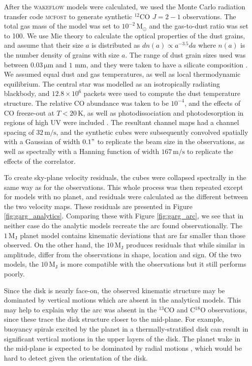 After the \textsc{wakeflow} models were calculated, we used the Monte Carlo radiation transfer code \textsc{mcfost} \citep{pinte2006,pinte2009} to generate synthetic $^{12}$CO $J=2-1$ observations.
The total gas mass of the model was set to $10^{-2} \, \mathrm{M_\odot}$ \citep{toci2019} and the gas-to-dust ratio was set to 100.
We use Mie theory \citep{mie1908} to calculate the optical properties of the dust grains, and assume that their size $a$ is distributed as $dn(a) \propto a^{-3.5} da$ where $n(a)$ is the number density of grains with size $a$.
The range of dust grain sizes used was between $0.03 \, \mathrm{\mu m}$ and $1$ mm, and they were taken to have a silicate composition \citep{weingartner2001}.
We assumed equal dust and gas temperatures, as well as local thermodynamic equilibrium.
The central star was modelled as an isotropically radiating blackbody, and $12.8\times 10^6$ packets were used to compute the dust temperature structure.
The relative CO abundance was taken to be $10^{-4}$, and the effects of CO freeze-out at $T < 20\, \mathrm{K}$, as well as photodissociation and photodesorption in regions of high UV were included \citep{pinte2018}.
The resultant channel maps had a channel spacing of $32 \, \mathrm{m/s}$, and the synthetic cubes were subsequently convolved spatially with a Gaussian of width $0.1"$ to replicate the beam size in the observations, as well as spectrally with a Hanning function of width $167 \, \mathrm{m/s}$ to replicate the effects of the correlator.

To create sky-plane velocity residuals, the cubes were collapsed spectrally in the same way as for the observations.
This whole process was then repeated except for models with no planet, and residuals were calculated as the different between the two velocity maps.
These residuals are presented in Figure \ref{fig:garg_analytics}.
Comparing these with Figure \ref{fig:garg_arc}, we see that in neither case do the analytic models recreate the arc found observationally.
The $1 \, \mathrm{M_J}$ planet model contains kinematic deviations that are far smaller than those observed.
On the other hand, the $10 \, \mathrm{M_J}$ produces residuals that while similar in amplitude, differ from the observations in shape, location and sign.
Of the two models, the $10 \, \mathrm{M_J}$ is more compatible with the observations but it still performs poorly.

Since the disk is nearly face-on, the observed kinematic structure may be dominated by vertical motions which are absent in the analytical models.
This may help to explain why the arc was absent in the $^{13}$CO and C$^{18}$O observations, since these trace the disk structure closer to the mid-plane.
For example, buoyancy spirals \citep{zhu2012,bae2021} excited by the planet in a thermally-stratified disk can result in significant vertical motions in the upper layers of the disk.
The planet wake in the mid-plane is expected to be dominated by radial motions \citep{rafikov2002a}, which would be hard to detect given the orientation of the disk.

